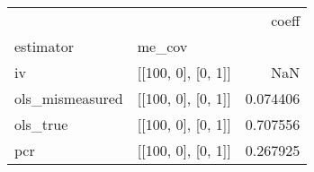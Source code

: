 \begin{tabular}{llr}
\toprule
    &                    &     coeff \\
estimator & me\_cov &           \\
\midrule
iv & [[100, 0], [0, 1]] &       NaN \\
ols\_mismeasured & [[100, 0], [0, 1]] &  0.074406 \\
ols\_true & [[100, 0], [0, 1]] &  0.707556 \\
pcr & [[100, 0], [0, 1]] &  0.267925 \\
\bottomrule
\end{tabular}
